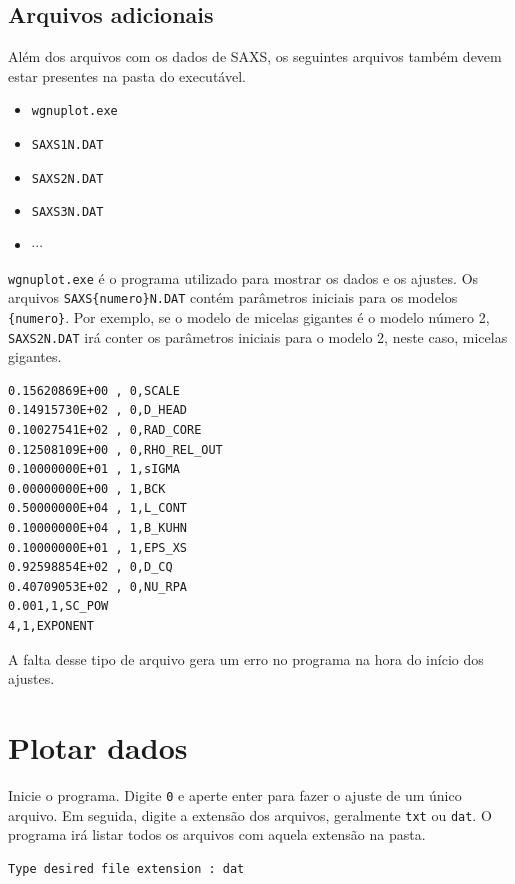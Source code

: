 \begin{apendicesenv}
\subsection{Arquivos adicionais}
Além dos arquivos com os dados de SAXS, os seguintes arquivos também devem estar presentes na pasta do executável.

\begin{itemize}
	\item \texttt{wgnuplot.exe}
	\item \texttt{SAXS1N.DAT}
	\item \texttt{SAXS2N.DAT}
	\item \texttt{SAXS3N.DAT}
	\item \(\cdots\)
\end{itemize}

\texttt{wgnuplot.exe} é o programa utilizado para mostrar os dados e os ajustes. Os arquivos \texttt{SAXS\{numero\}N.DAT} contém parâmetros iniciais para os modelos \texttt{\{numero\}}. Por exemplo, se o modelo de micelas gigantes é o modelo número 2, \texttt{SAXS2N.DAT} irá conter os parâmetros iniciais para o modelo 2, neste caso, micelas gigantes.

\begin{verbatim}
0.15620869E+00 , 0,SCALE               
0.14915730E+02 , 0,D_HEAD              
0.10027541E+02 , 0,RAD_CORE            
0.12508109E+00 , 0,RHO_REL_OUT         
0.10000000E+01 , 1,sIGMA               
0.00000000E+00 , 1,BCK                 
0.50000000E+04 , 1,L_CONT              
0.10000000E+04 , 1,B_KUHN              
0.10000000E+01 , 1,EPS_XS              
0.92598854E+02 , 0,D_CQ                
0.40709053E+02 , 0,NU_RPA              
0.001,1,SC_POW
4,1,EXPONENT
\end{verbatim}

A falta desse tipo de arquivo gera um erro no programa na hora do início dos ajustes.

\section{Plotar dados}
Inicie o programa. Digite \texttt{0} e aperte enter para fazer o ajuste de um único arquivo. Em seguida, digite a extensão dos arquivos, geralmente \texttt{txt} ou \texttt{dat}. O programa irá listar todos os arquivos com aquela extensão na pasta.

\begin{verbatim}
Type desired file extension : dat


\end{verbatim}
\end{apendicesenv}
